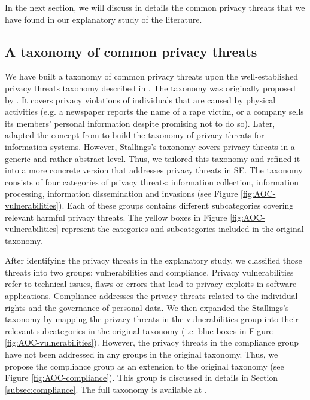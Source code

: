 In the next section, we will discuss in details the common privacy threats that we have found in our explanatory study of the literature.

\subsection{A taxonomy of common privacy threats} \label{subsec:areas-of-concern}

We have built a taxonomy of common privacy threats upon the well-established privacy threats taxonomy described in \cite{Stallings2019}. The taxonomy was originally proposed by \cite{Solove2006a}. It covers privacy violations of individuals that are caused by physical activities (e.g. a newspaper reports the name of a rape victim, or a company sells its members' personal information despite promising not to do so). Later, \citeauthor{Stallings2019} adapted the concept from \cite{Solove2006a} to build the taxonomy of privacy threats for information systems. However, Stallings's taxonomy covers privacy threats in a generic and rather abstract level. Thus, we tailored this taxonomy and refined it into a more concrete version that addresses privacy threats in SE. The taxonomy consists of four categories of privacy threats: information collection, information processing, information dissemination and invasions (see Figure \ref{fig:AOC-vulnerabilities}). Each of these groups contains different subcategories covering relevant harmful privacy threats. The yellow boxes in Figure \ref{fig:AOC-vulnerabilities} represent the categories and subcategories included in the original taxonomy.

After identifying the privacy threats in the explanatory study, we classified those threats into two groups: vulnerabilities and compliance. Privacy vulnerabilities refer to technical issues, flaws or errors that lead to privacy exploits in software applications. Compliance addresses the privacy threats related to the individual rights and the governance of personal data. We then expanded the Stallings's taxonomy by mapping the privacy threats in the vulnerabilities group into their relevant subcategories in the original taxonomy (i.e. blue boxes in Figure \ref{fig:AOC-vulnerabilities}). However, the privacy threats in the compliance group have not been addressed in any groups in the original taxonomy. Thus, we propose the compliance group as an extension to the original taxonomy (see Figure \ref{fig:AOC-compliance}). This group is discussed in details in Section \ref{subsec:compliance}. The full taxonomy is available at \cite{rep-pkg-privul}.

